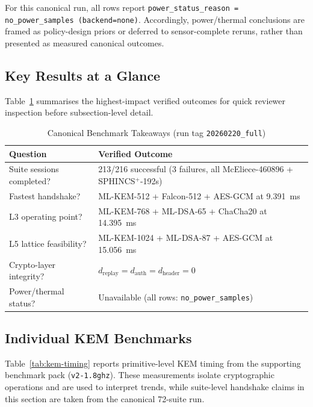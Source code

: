 \documentclass[conference]{IEEEtran}
\begin{document}
For this canonical run, all rows report \texttt{power\_status\_reason = no\_power\_samples (backend=none)}.
Accordingly, power/thermal conclusions are framed as policy-design priors or deferred to sensor-complete reruns, rather than presented as measured canonical outcomes.

\subsection{Key Results at a Glance}

Table~\ref{tab:key-takeaways} summarises the highest-impact verified outcomes for quick reviewer inspection before subsection-level detail.

\begin{table}[t]
\centering
\caption{Canonical Benchmark Takeaways (run tag \texttt{20260220\_full})}
\label{tab:key-takeaways}
\scriptsize
\begin{tabular}{@{}p{2.6cm}p{4.4cm}@{}}
\toprule
\textbf{Question} & \textbf{Verified Outcome} \\
\midrule
Suite sessions completed? & 213/216 successful (3 failures, all McEliece-460896 + SPHINCS$^+$-192s) \\
Fastest handshake? & ML-KEM-512 + Falcon-512 + AES-GCM at \SI{9.391}{\milli\second} \\
L3 operating point? & ML-KEM-768 + ML-DSA-65 + ChaCha20 at \SI{14.395}{\milli\second} \\
L5 lattice feasibility? & ML-KEM-1024 + ML-DSA-87 + AES-GCM at \SI{15.056}{\milli\second} \\
Crypto-layer integrity? & $d_{\text{replay}}=d_{\text{auth}}=d_{\text{header}}=0$ \\
Power/thermal status? & Unavailable (all rows: \texttt{no\_power\_samples}) \\
\bottomrule
\end{tabular}
\end{table}

\subsection{Individual KEM Benchmarks}

Table~\ref{tab:kem-timing} reports primitive-level KEM timing from the supporting benchmark pack (\texttt{v2-1.8ghz}).
These measurements isolate cryptographic operations and are used to interpret trends, while suite-level handshake claims in this section are taken from the canonical 72-suite run.
\end{document}

